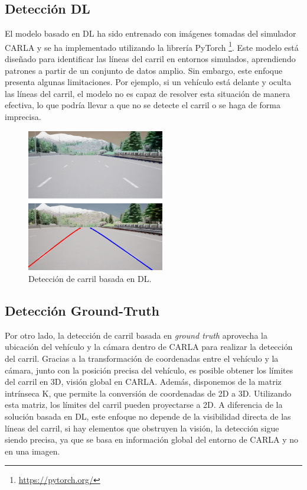 \subsection{Detección \ac{DL}}
\label{sec:gt}

El modelo basado en \ac{DL} ha sido entrenado con imágenes tomadas del simulador CARLA y se ha implementado utilizando la librería PyTorch \footnote{\url{https://pytorch.org/}}. Este modelo está diseñado para identificar las líneas del carril en entornos simulados, aprendiendo patrones a partir de un conjunto de datos amplio. Sin embargo, este enfoque presenta algunas limitaciones. Por ejemplo, si un vehículo está delante y oculta las líneas del carril, el modelo no es capaz de resolver esta situación de manera efectiva, lo que podría llevar a que no se detecte el carril o se haga de forma imprecisa.

\begin{figure}[ht]
  \begin{center}
    \includegraphics[width=6cm]{figs/Plataformas_Desarollo/carla_lane_dl.png}
  \end{center}
  \caption{Detección de carril basada en \ac{DL}.}
  \label{dl_lane}
\end{figure}

\subsection{Detección Ground-Truth}
\label{sec:gt}

Por otro lado, la detección de carril basada en \textit{ground truth} aprovecha la ubicación del vehículo y la cámara dentro de CARLA para realizar la detección del carril. Gracias a la transformación de coordenadas entre el vehículo y la cámara, junto con la posición precisa del vehículo, es posible obtener los límites del carril en 3D, visión global en CARLA. Además, disponemos de la matriz intrínseca K, que permite la conversión de coordenadas de 2D a 3D. Utilizando esta matriz, los límites del carril pueden proyectarse a 2D. A diferencia de la solución basada en \ac{DL}, este enfoque no depende de la visibilidad directa de las líneas del carril, si hay elementos que obstruyen la visión, la detección sigue siendo precisa, ya que se basa en información global del entorno de CARLA y no en una imagen.

